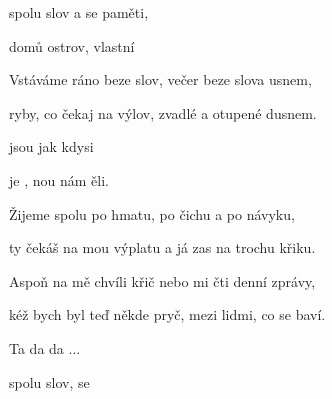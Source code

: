 

\zs
{} spolu  slov a  se  paměti,

 domů  ostrov,  vlastní  
\ks

\zs
Vstáváme ráno beze slov, večer beze slova usnem,

ryby, co čekaj na výlov, zvadlé a otupené dusnem.
\ks

\zr
{} jsou jak   kdysi 

 je , nou nám ěli.
\kr

\zs
Žijeme spolu po hmatu, po čichu a po návyku,

ty čekáš na mou výplatu a já zas na trochu křiku.
\ks

\zs
Aspoň na mě chvíli křič nebo mi čti denní zprávy,

kéž bych byl teď někde pryč, mezi lidmi, co se baví.
\ks

\zr Ta da da ... \kr


 spolu  slov,  se 

\kp

























